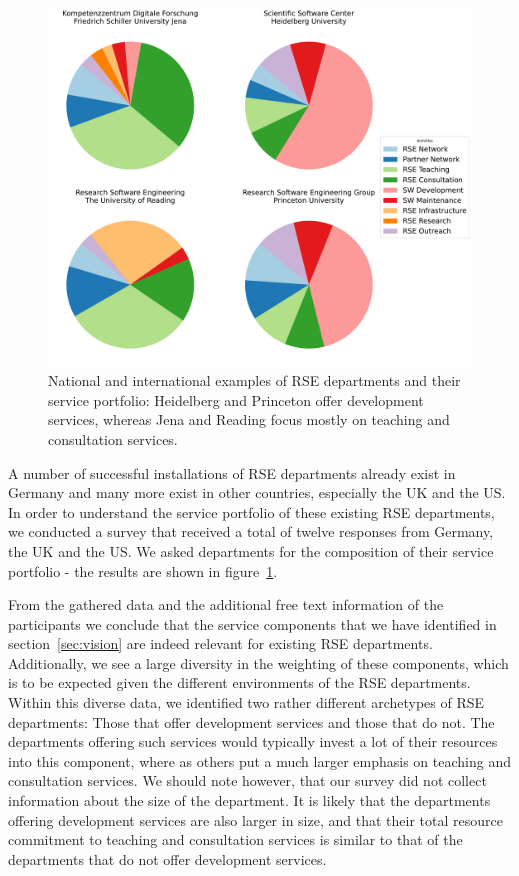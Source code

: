 \documentclass[a4paper]{article}
\begin{document}
\begin{figure}
\label{fig:survey}
\centering
\includegraphics[width=\textwidth]{./group_composition_plot/pdf/group_composition_plot_the_fantastic_four.pdf}
\caption{National and international examples of RSE departments and their service portfolio: Heidelberg and Princeton offer development services, whereas Jena and Reading focus mostly on teaching and consultation services.}
\end{figure}

A number of successful installations of RSE departments already exist in Germany and many more exist in other countries, especially the UK and the US.
In order to understand the service portfolio of these existing RSE departments, we conducted a survey that received a total of twelve responses from Germany, the UK and the US.
We asked departments for the composition of their service portfolio - the results are shown in figure~\ref{fig:survey}.

From the gathered data and the additional free text information of the participants we conclude that the service components that we have identified in section~\ref{sec:vision} are indeed relevant for existing RSE departments.
Additionally, we see a large diversity in the weighting of these components, which is to be expected given the different environments of the RSE departments.
Within this diverse data, we identified two rather different archetypes of RSE departments: Those that offer development services and those that do not.
The departments offering such services would typically invest a lot of their resources into this component, where as others put a much larger emphasis on teaching and consultation services.
We should note however, that our survey did not collect information about the size of the department.
It is likely that the departments offering development services are also larger in size,
and that their total resource commitment to teaching and consultation services is similar to that of the departments that do not offer development services.
\end{document}
